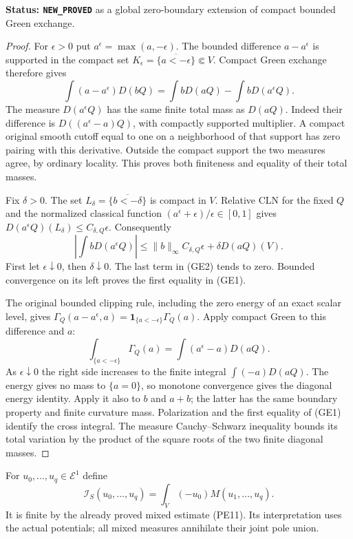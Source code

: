 \noindent\textbf{Status: \texttt{NEW\_PROVED}} as a global
zero-boundary extension of compact bounded Green exchange.

\begin{proof}
For $\epsilon>0$ put $a^\epsilon=\max(a,-\epsilon)$.
The bounded difference $a-a^\epsilon$ is supported in the compact
set $K_\epsilon=\overline{\{a<-\epsilon\}}\Subset V$.
Compact Green exchange therefore gives
\[
 \int(a-a^\epsilon)D(bQ)
     =\int bD(aQ)-\int bD(a^\epsilon Q).
 \tag{GE2}
\]
The measure $D(a^\epsilon Q)$ has the same finite total mass as
$D(aQ)$. Indeed their difference is $D((a^\epsilon-a)Q)$,
with compactly supported multiplier. A compact original smooth
cutoff equal to one on a neighborhood of that support has zero
pairing with this derivative. Outside the compact support the
two measures agree, by ordinary locality. This proves both
finiteness and equality of their total masses.

Fix $\delta>0$. The set
$L_\delta=\overline{\{b<-\delta\}}$ is compact in $V$.
Relative CLN for the fixed $Q$ and the normalized classical
function $(a^\epsilon+\epsilon)/\epsilon\in[0,1]$ gives
$D(a^\epsilon Q)(L_\delta)\leq C_{\delta,Q}\epsilon$.
Consequently
\[
 \left|\int bD(a^\epsilon Q)\right|
 \leq \|b\|_\infty C_{\delta,Q}\epsilon
                     +\delta D(aQ)(V).
 \tag{GE3}
\]
First let $\epsilon\downarrow0$, then $\delta\downarrow0$.
The last term in (GE2) tends to zero. Bounded convergence on
its left proves the first equality in (GE1).

The original bounded clipping rule, including the zero energy
of an exact scalar level, gives
$\Gamma_Q(a-a^\epsilon,a)
 =\mathbf1_{\{a<-\epsilon\}}\Gamma_Q(a)$.
Apply compact Green to this difference and $a$:
\[
 \int_{\{a<-\epsilon\}}\Gamma_Q(a)
                 =\int(a^\epsilon-a)D(aQ).
 \tag{GE4}
\]
As $\epsilon\downarrow0$ the right side increases to the
finite integral $\int(-a)D(aQ)$. The energy gives no mass
to $\{a=0\}$, so monotone convergence gives the diagonal
energy identity. Apply it also to $b$ and $a+b$; the latter
has the same boundary property and finite curvature mass.
Polarization and the first equality of (GE1) identify the
cross integral. The measure Cauchy--Schwarz inequality bounds
its total variation by the product of the square roots of the
two finite diagonal masses.
\end{proof}

For $u_0,\ldots,u_q\in\mathcal E^1$ define
\[
 \mathcal I_S(u_0,\ldots,u_q)
       =\int_V(-u_0)M(u_1,\ldots,u_q).
 \tag{GE5}
\]
It is finite by the already proved mixed estimate (PE11).
Its interpretation uses the actual potentials; all mixed
measures annihilate their joint pole union.

